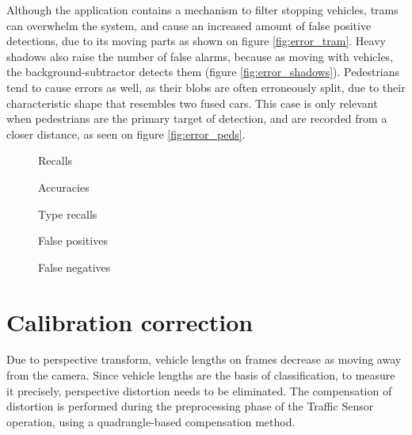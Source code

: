 Although the application contains a mechanism to filter stopping vehicles, trams can overwhelm the system, and cause an increased amount of false positive detections, due to its moving parts as shown on figure \ref{fig:error_tram}.
Heavy shadows also raise the number of false alarms, because as moving with vehicles, the background-subtractor detects them (figure \ref{fig:error_shadows}).
Pedestrians tend to cause errors as well, as their blobs are often erroneously split, due to their characteristic shape that resembles two fused cars.
This case is only relevant when pedestrians are the primary target of detection, and are recorded from a closer distance, as seen on figure \ref{fig:error_peds}.

\begin{figure}[p]
	\centering
	\caption{Recalls \label{chart:recalls}}
\end{figure}

\begin{figure}[p]
	\centering
	\caption{Accuracies \label{chart:accuracies}}
\end{figure}

\begin{figure}[p]
	\centering
	\caption{Type recalls \label{chart:type_recalls}}
\end{figure}

\begin{figure}[p]
	\centering
	\caption{False positives \label{chart:false_positives}}
\end{figure}

\begin{figure}[p]
	\centering
	\caption{False negatives \label{chart:false_negatives}}
\end{figure}

\FloatBarrier
\section{Calibration correction}\label{chap:cal_corr}
Due to perspective transform, vehicle lengths on frames decrease as moving away from the camera.
Since vehicle lengths are the basis of classification, to measure it precisely, perspective distortion needs to be eliminated.
The compensation of distortion is performed during the preprocessing phase of the Traffic Sensor operation, using a quadrangle-based compensation method.

